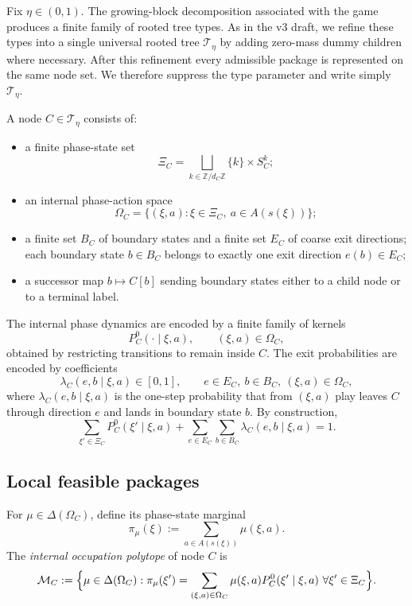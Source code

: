 \documentclass[12pt]{article}
\theoremstyle{definition}
\newcommand{\1}{\mathbf{1}}
\newcommand{\cM}{\mathcal{M}}
\newcommand{\cT}{\mathcal{T}}
\begin{document}
Fix \(\eta\in(0,1)\).  The growing-block decomposition associated with the game produces a
finite family of rooted tree types.  As in the v3 draft, we refine these types into a
single universal rooted tree \(\cT_\eta\) by adding zero-mass dummy children where
necessary.  After this refinement every admissible package is represented on the same node
set.  We therefore suppress the type parameter and write simply \(\cT_\eta\).

A node \(C\in \cT_\eta\) consists of:
\begin{itemize}[leftmargin=2em]
\item a finite phase-state set
\[
\Xi_C=\bigsqcup_{k\in\mathbb Z/d_C\mathbb Z}\{k\}\times S_C^k;
\]
\item an internal phase-action space
\[
\Omega_C=\{(\xi,a):\xi\in \Xi_C,\ a\in A(s(\xi))\};
\]
\item a finite set \(B_C\) of boundary states and a finite set \(E_C\) of coarse exit
directions; each boundary state \(b\in B_C\) belongs to exactly one exit direction
\(e(b)\in E_C\);
\item a successor map \(b\mapsto C[b]\) sending boundary states either to a child node or
to a terminal label.
\end{itemize}

The internal phase dynamics are encoded by a finite family of kernels
\[
P_C^0(\cdot\mid \xi,a),\qquad (\xi,a)\in \Omega_C,
\]
obtained by restricting transitions to remain inside \(C\).  The exit probabilities are
encoded by coefficients
\[
\lambda_C(e,b\mid \xi,a)\in[0,1],\qquad e\in E_C,\ b\in B_C,\ (\xi,a)\in \Omega_C,
\]
where \(\lambda_C(e,b\mid \xi,a)\) is the one-step probability that from \((\xi,a)\) play
leaves \(C\) through direction \(e\) and lands in boundary state \(b\).  By construction,
\[
\sum_{\xi'\in \Xi_C} P_C^0(\xi'\mid \xi,a)
+
\sum_{e\in E_C}\sum_{b\in B_C}\lambda_C(e,b\mid \xi,a)
=
1.
\]

\subsection{Local feasible packages}

For \(\mu\in\Delta(\Omega_C)\), define its phase-state marginal
\[
\pi_\mu(\xi):=\sum_{a\in A(s(\xi))}\mu(\xi,a).
\]
The \emph{internal occupation polytope} of node \(C\) is
\begin{equation}
\label{eq:MC}
\cM_C
:=
\Bigl\{
\mu\in \Delta(\Omega_C):
\pi_\mu(\xi')
=
\sum_{(\xi,a)\in \Omega_C}\mu(\xi,a)P_C^0(\xi'\mid \xi,a)
\ \forall \xi'\in \Xi_C
\Bigr\}.
\end{equation}
\end{document}
